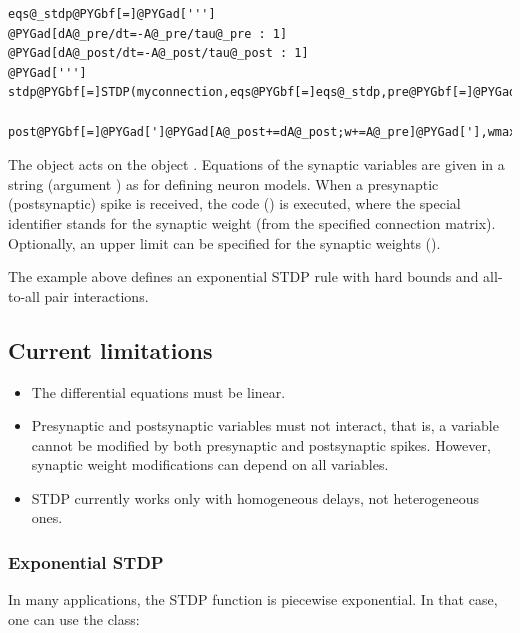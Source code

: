 \documentclass[letterpaper,10pt,english]{manual}
\begin{document}
\begin{Verbatim}[commandchars=@\[\]]
eqs@_stdp@PYGbf[=]@PYGad[''']
@PYGad[dA@_pre/dt=-A@_pre/tau@_pre : 1]
@PYGad[dA@_post/dt=-A@_post/tau@_post : 1]
@PYGad[''']
stdp@PYGbf[=]STDP(myconnection,eqs@PYGbf[=]eqs@_stdp,pre@PYGbf[=]@PYGad[']@PYGad[A@_pre+=dA@_pre;w+=A@_post]@PYGad['],
          post@PYGbf[=]@PYGad[']@PYGad[A@_post+=dA@_post;w+=A@_pre]@PYGad['],wmax@PYGbf[=]gmax)
\end{Verbatim}

The \hyperlink{brian.STDP}{} object acts on the \hyperlink{brian.Connection}{} object
. Equations of the synaptic variables are given in
a string (argument ) as for defining neuron models.
When a presynaptic (postsynaptic) spike is received, the code
 () is executed, where the special identifier
 stands for the synaptic weight (from the specified
connection matrix). Optionally, an upper limit can be specified
for the synaptic weights ().

The example above defines an exponential STDP rule with hard bounds
and all-to-all pair interactions.


\subsection{Current limitations}
\begin{itemize}
\item {} 
The differential equations must be linear.

\item {} 
Presynaptic and postsynaptic variables must not interact, that is,
a variable cannot be modified by both presynaptic and postsynaptic
spikes. However, synaptic weight modifications can depend on all variables.

\item {} 
STDP currently works only with homogeneous delays, not heterogeneous ones.

\end{itemize}


\subsubsection{Exponential STDP}

In many applications, the STDP function is piecewise exponential.
In that case, one can use the \hyperlink{brian.ExponentialSTDP}{} class:
\end{document}
